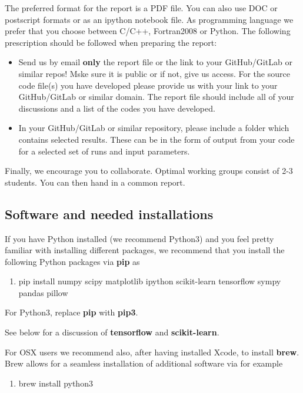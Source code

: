 \documentclass[%
oneside,                 %
final,                   %
10pt]{article}
\begin{document}
The preferred format for the report is a PDF file. You can also use DOC or postscript formats or as an ipython notebook file.  As programming language we prefer that you choose between C/C++, Fortran2008 or Python. The following prescription should be followed when preparing the report:

\begin{itemize}
  \item Send us by email  \textbf{only} the report file or the link to your GitHub/GitLab or similar repos!  Mske sure it is public or if not, give us access. For the source code file(s) you have developed please provide us with your link to your GitHub/GitLab or similar  domain.  The report file should include all of your discussions and a list of the codes you have developed. 

  \item In your GitHub/GitLab or similar repository, please include a folder which contains selected results. These can be in the form of output from your code for a selected set of runs and input parameters.
\end{itemize}

\noindent
Finally, 
we encourage you to collaborate. Optimal working groups consist of 
2-3 students. You can then hand in a common report. 

\subsection{Software and needed installations}

If you have Python installed (we recommend Python3) and you feel pretty familiar with installing different packages, 
we recommend that you install the following Python packages via \textbf{pip} as
\begin{enumerate}
\item pip install numpy scipy matplotlib ipython scikit-learn tensorflow sympy pandas pillow
\end{enumerate}

\noindent
For Python3, replace \textbf{pip} with \textbf{pip3}.

See below for a discussion of \textbf{tensorflow} and \textbf{scikit-learn}. 

For OSX users we recommend also, after having installed Xcode, to install \textbf{brew}. Brew allows 
for a seamless installation of additional software via for example
\begin{enumerate}
\item brew install python3
\end{enumerate}
\end{document}
